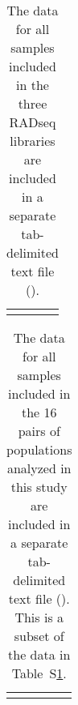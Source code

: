 \begin{table}[htbp]
\sffamily
\captionsetup{name=Table S, labelformat=noSpace}
\caption{
    The data for all samples included in the three RADseq libraries are
    included in a separate tab-delimited text file
    ().
}
\centering
\begin{tabular}{ l l }
     &  \\
\end{tabular}
\label{table:reftosampledata}
\end{table}

\begin{table}[htbp]
\sffamily
\captionsetup{name=Table S, labelformat=noSpace}
\caption{
    The data for all samples included in the 16 pairs of populations analyzed
    in this study are included in a separate tab-delimited text file
    ().
    This is a subset of the data in Table~S\ref{table:reftosampledata}.
}
\centering
\begin{tabular}{ l l }
     &  \\
\end{tabular}
\label{table:reftopairsampledata}
\end{table}





